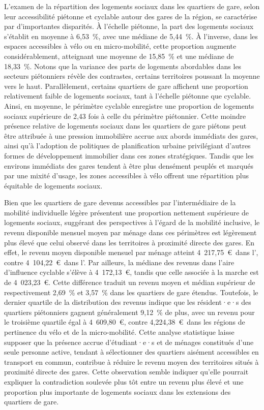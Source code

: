 \begin{refsegment}
L'examen de la répartition des logements sociaux dans les quartiers de gare, selon leur accessibilité piétonne et cyclable autour des gares de la région, se caractérise par d'importantes disparités. À l'échelle piétonne, la part des logements sociaux s'établit en moyenne à 6,53~\%, avec une médiane de 5,44~\%. À l'inverse, dans les espaces accessibles à vélo ou en micro-mobilité, cette proportion augmente considérablement, atteignant une moyenne de 15,85~\% et une médiane de 18,33~\%. Notons que la variance des parts de logements abordables dans les secteurs piétonniers révèle des contrastes, certains territoires poussant la moyenne vers le haut. Parallèlement, certains quartiers de gare affichent une proportion relativement faible de logements sociaux, tant à l'échelle piétonne que cyclable. Ainsi, en moyenne, le périmètre cyclable enregistre une proportion de logements sociaux supérieure de 2,43 fois à celle du périmètre piétonnier. Cette moindre présence relative de logements sociaux dans les quartiers de gare piétons peut être attribuée à une pression immobilière accrue aux abords immédiats des gares, ainsi qu'à l'adoption de politiques de planification urbaine privilégiant d'autres formes de développement immobilier dans ces zones stratégiques. Tandis que les environs immédiats des gares tendent à être plus densément peuplés et marqués par une mixité d'usage, les zones accessibles à vélo offrent une répartition plus équitable de logements sociaux.%
    
Bien que les quartiers de gare devenus accessibles par l'intermédiaire de la mobilité individuelle légère présentent une proportion nettement supérieure de logements sociaux, suggérant des perspectives à l'égard de la mobilité inclusive, le revenu disponible mensuel moyen par ménage dans ces périmètres est légèrement plus élevé que celui observé dans les territoires à proximité directe des gares. En effet, le revenu moyen disponible mensuel par ménage atteint 4~217,75~\euro~dans l', contre 4~104,22~\euro~dans l'. Par ailleurs, la médiane des revenus dans l'aire d'influence cyclable s'élève à 4~172,13~\euro, tandis que celle associée à la marche est de 4~023,23~\euro. Cette différence traduit un revenu moyen et médian supérieur de respectivement 2,69~\% et 3,57~\% dans les quartiers de gare étendus. Toutefois, le dernier quartile de la distribution des revenus indique que les résident·e·s des quartiers piétonniers gagnent généralement 9,12~\% de plus, avec un revenu pour le troisième quartile égal à 4~609,80~\euro, contre 4,224,38~\euro~dans les régions de pertinence du vélo et de la micro-mobilité. Cette analyse statistique laisse supposer que la présence accrue d'étudiant·e·s et de ménages constitués d'une seule personne active, tendant à sélectionner des quartiers aisément accessibles en transport en commun, contribue à réduire le revenu moyen des territoires situés à proximité directe des gares. Cette observation semble indiquer qu'elle pourrait expliquer la contradiction soulevée plus tôt entre un revenu plus élevé et une proportion plus importante de logements sociaux dans les extensions des quartiers de gare.%


\end{refsegment}
